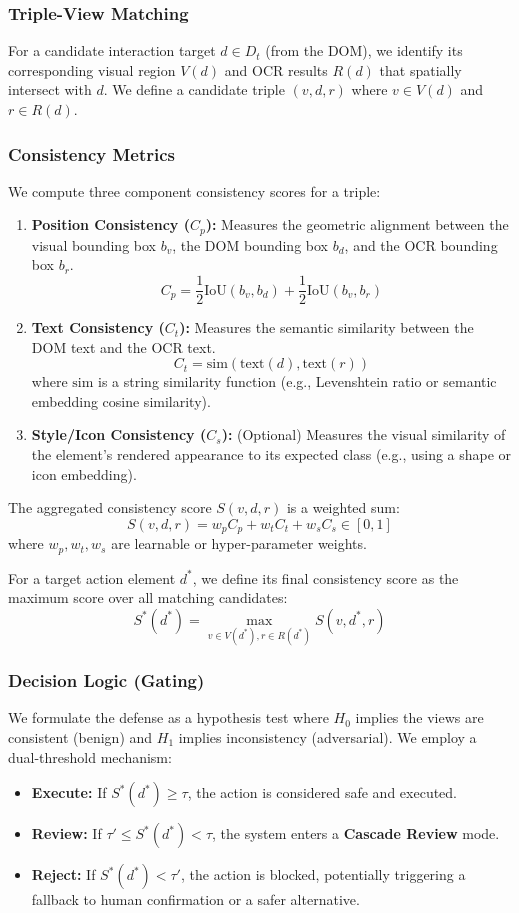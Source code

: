 \documentclass[runningheads]{llncs}
\begin{document}
\subsubsection{Triple-View Matching}
For a candidate interaction target $d \in D_t$ (from the DOM), we identify its corresponding visual region $V(d)$ and OCR results $R(d)$ that spatially intersect with $d$. We define a candidate triple $(v, d, r)$ where $v \in V(d)$ and $r \in R(d)$.

\subsubsection{Consistency Metrics}
We compute three component consistency scores for a triple:
\begin{enumerate}
    \item \textbf{Position Consistency ($C_p$):} Measures the geometric alignment between the visual bounding box $b_v$, the DOM bounding box $b_d$, and the OCR bounding box $b_r$.
    \[
    C_p = \frac{1}{2}\text{IoU}(b_v, b_d) + \frac{1}{2}\text{IoU}(b_v, b_r)
    \]
    \item \textbf{Text Consistency ($C_t$):} Measures the semantic similarity between the DOM text and the OCR text.
    \[
    C_t = \text{sim}(\text{text}(d), \text{text}(r))
    \]
    where $\text{sim}$ is a string similarity function (e.g., Levenshtein ratio or semantic embedding cosine similarity).
    \item \textbf{Style/Icon Consistency ($C_s$):} (Optional) Measures the visual similarity of the element's rendered appearance to its expected class (e.g., using a shape or icon embedding).
\end{enumerate}

The aggregated consistency score $S(v, d, r)$ is a weighted sum:
\[
S(v, d, r) = w_p C_p + w_t C_t + w_s C_s \in [0, 1]
\]
where $w_p, w_t, w_s$ are learnable or hyper-parameter weights.

For a target action element $d^*$, we define its final consistency score as the maximum score over all matching candidates:
\[
S^*(d^*) = \max_{v \in V(d^*), r \in R(d^*)} S(v, d^*, r)
\]

\subsubsection{Decision Logic (Gating)}
We formulate the defense as a hypothesis test where $H_0$ implies the views are consistent (benign) and $H_1$ implies inconsistency (adversarial). We employ a dual-threshold mechanism:
\begin{itemize}
    \item \textbf{Execute:} If $S^*(d^*) \ge \tau$, the action is considered safe and executed.
    \item \textbf{Review:} If $\tau' \le S^*(d^*) < \tau$, the system enters a \textbf{Cascade Review} mode.
    \item \textbf{Reject:} If $S^*(d^*) < \tau'$, the action is blocked, potentially triggering a fallback to human confirmation or a safer alternative.
\end{itemize}
\end{document}
